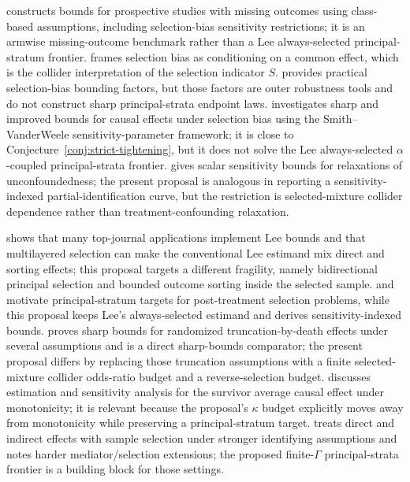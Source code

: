 \documentclass[11pt]{article}
\theoremstyle{definition}
\theoremstyle{plain}
\theoremstyle{remark}
\begin{document}
\citet{ScharfsteinManskiAnthony2004Bounds} constructs bounds for prospective studies with missing outcomes using class-based assumptions, including selection-bias sensitivity restrictions; it is an armwise missing-outcome benchmark rather than a Lee always-selected principal-stratum frontier.  \citet{HernanHernandezDiazRobins2004Selection} frames selection bias as conditioning on a common effect, which is the collider interpretation of the selection indicator \(S\).  \citet{SmithVanderWeele2019Selection} provides practical selection-bias bounding factors, but those factors are outer robustness tools and do not construct sharp principal-strata endpoint laws.  \citet{ZetterstromSjolanderWaernbaum2025Selection} investigates sharp and improved bounds for causal effects under selection bias using the Smith--VanderWeele sensitivity-parameter framework; it is close to Conjecture~\ref{conj:strict-tightening}, but it does not solve the Lee always-selected \(\alpha\)-coupled principal-strata frontier.  \citet{MastenPoirierZhang2024Sensitivity} gives scalar sensitivity bounds for relaxations of unconfoundedness; the present proposal is analogous in reporting a sensitivity-indexed partial-identification curve, but the restriction is selected-mixture collider dependence rather than treatment-confounding relaxation.

\citet{KroftMourifieVayalinkal2024MultilayeredLee} shows that many top-journal applications implement Lee bounds and that multilayered selection can make the conventional Lee estimand mix direct and sorting effects; this proposal targets a different fragility, namely bidirectional principal selection and bounded outcome sorting inside the selected sample.  \citet{ZhangRubin2003TruncationDeath} and \citet{FrangakisRubin2002PrincipalStratification} motivate principal-stratum targets for post-treatment selection problems, while this proposal keeps Lee's always-selected estimand and derives sensitivity-indexed bounds.  \citet{Imai2008TruncationDeath} proves sharp bounds for randomized truncation-by-death effects under several assumptions and is a direct sharp-bounds comparator; the present proposal differs by replacing those truncation assumptions with a finite selected-mixture collider odds-ratio budget and a reverse-selection budget.  \citet{Chiba2012SACE} discusses estimation and sensitivity analysis for the survivor average causal effect under monotonicity; it is relevant because the proposal's \(\kappa\) budget explicitly moves away from monotonicity while preserving a principal-stratum target.  \citet{HuberSolovyeva2020SelectionMediation} treats direct and indirect effects with sample selection under stronger identifying assumptions and notes harder mediator/selection extensions; the proposed finite-\(\Gamma\) principal-strata frontier is a building block for those settings.
\end{document}

